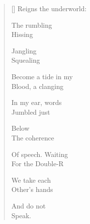 \label{ch:pandemonium}
\settowidth{\versewidth}{Reigns the underworld:}
\begin{verse}[\versewidth]
Reigns the underworld:

The rumbling\\
Hissing

Jangling\\
Squealing

Become a tide in my\\
Blood, a clanging

In my ear, words\\
Jumbled just

Below\\
The coherence

Of speech.   Waiting\\
For the Double-R

We take each\\
Other's hands

And do not\\
Speak.
\end{verse}
